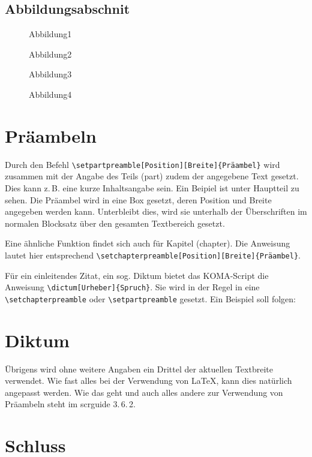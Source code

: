 \documentclass[a4paper,
	twoside,
	openany,							%
	headsepline,					%
	footsepline,					%
	headings = normal,
	toc  	 = chapterentrywithdots,
	listof = totoc,
	listof = entryprefix,
	bibliography = totoc	%
]
{scrbook}
\begin{document}
	\section{Abbildungsabschnit}
	\label{sec:Abbildungsabschnit}

	\begin{figure}[htbp]
		\caption{Abbildung1}
		\caption{Abbildung2}
		\caption{Abbildung3}
		\caption{Abbildung4}
	\end{figure}
\chapter{Präambeln}

Durch den Befehl \verb#\setpartpreamble[Position][Breite]{Präambel}# wird zusammen mit der Angabe des Teils (part) zudem der angegebene Text gesetzt. Dies kann z.\,B. eine kurze Inhaltsangabe sein. Ein Beipiel ist unter Hauptteil zu sehen.  Die Präambel wird in eine Box gesetzt, deren Position und Breite angegeben werden kann. Unterbleibt dies, wird sie unterhalb der Überschriften im normalen Blocksatz über den gesamten Textbereich gesetzt.

Eine ähnliche Funktion findet sich auch für Kapitel (chapter). Die Anweisung lautet hier entsprechend \verb#\setchapterpreamble[Position][Breite]{Präambel}#. 

Für ein einleitendes Zitat, ein sog. Diktum bietet das KOMA-Script die Anweisung \verb#\dictum[Urheber]{Spruch}#. Sie wird in der Regel in eine \verb#\setchapterpreamble# oder \verb#\setpartpreamble# gesetzt. Ein Beispiel soll folgen:

\chapter{Diktum}

Übrigens wird ohne weitere Angaben ein Drittel der aktuellen Textbreite verwendet. Wie fast alles bei der Verwendung von \LaTeX , kann dies natürlich angepasst werden. Wie das geht und auch alles andere zur Verwendung von Präambeln steht im scrguide 3.\,6.\,2.


\appendix							%
\clearpairofpagestyles
{} 
\chapter{Schluss}
\end{document}
